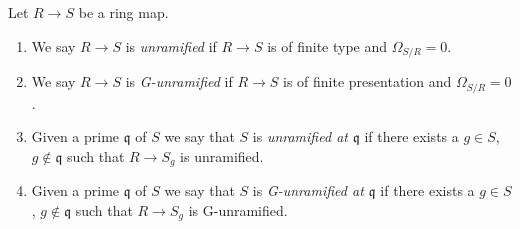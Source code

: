 \begin{definition}
\label{definition-unramified}
Let $R \to S$ be a ring map.
\begin{enumerate}
\item We say $R \to S$ is {\it unramified} if $R \to S$ is of
finite type and $\Omega_{S/R} = 0$.
\item We say $R \to S$ is {\it G-unramified} if $R \to S$ is of finite
presentation and $\Omega_{S/R} = 0$.
\item Given a prime $\mathfrak q$ of $S$ we say that $S$ is
{\it unramified at $\mathfrak q$} if there exists a
$g \in S$, $g \not \in \mathfrak q$ such that $R \to S_g$ is unramified.
\item Given a prime $\mathfrak q$ of $S$ we say that $S$ is
{\it G-unramified at $\mathfrak q$} if there exists a
$g \in S$, $g \not \in \mathfrak q$ such that $R \to S_g$ is G-unramified.
\end{enumerate}
\end{definition}